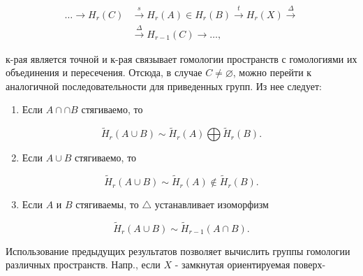 \documentclass[10pt]{article}
\begin{document}
\[

\begin{aligned}

\ldots \longrightarrow H_{r}(C) & \stackrel{s}{\longrightarrow} H_{r}(A) \in H_{r}(B) \stackrel{t}{\longrightarrow} H_{r}(X) \stackrel{\Delta}{\longrightarrow} \\

& \stackrel{\Delta}{\longrightarrow} H_{r-1}(C) \longrightarrow \ldots,

\end{aligned}

\]



к-рая является точной и к-рая связывает гомологии пространств с гомологиями их объединения и пересечения. Отсюда, в случае $C \neq \varnothing$, можно перейти к аналогичной последовательности для приведенных групп. Из нее следует:



\begin{enumerate}

  \item Если $A \cap \cap B$ стягиваемо, то

\end{enumerate}



\[

\tilde{H}_{r}(A \cup B) \sim \tilde{H}_{r}(A) \bigoplus \tilde{H}_{r}(B) .

\]



\begin{enumerate}

  \setcounter{enumi}{1}

  \item Если $A \cup B$ стягиваемо, то

\end{enumerate}



\[

\tilde{H}_{r}(A \cup B) \sim \tilde{H}_{r}(A) \notin \tilde{H}_{r}(B) .

\]



\begin{enumerate}

  \setcounter{enumi}{2}

  \item Если $A$ и $B$ стягиваемы, то $\triangle$ устанавливает изоморфизм

\end{enumerate}



\[

\tilde{H}_{r}(A \cup B) \sim \tilde{H}_{r-1}(A \cap B) .

\]



Использование предыдущих результатов позволяет вычислить группы гомологии различных пространств. Напр., если $X$ - замкнутая ориентируемая поверх-
\end{document}
